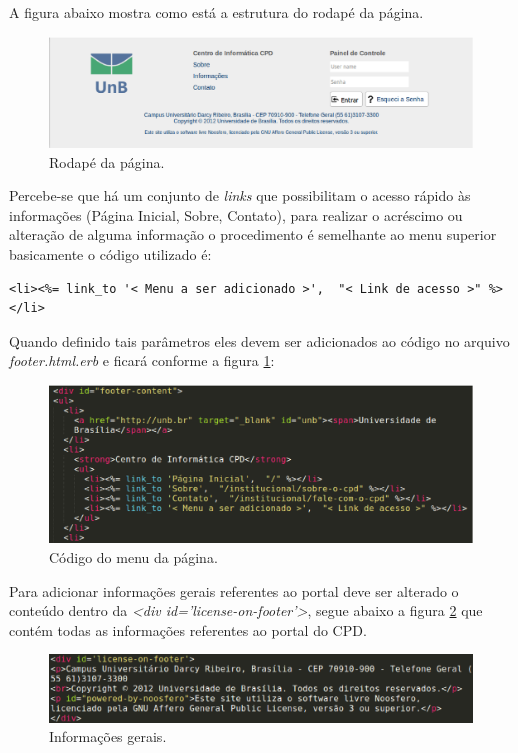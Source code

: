 A figura abaixo mostra como está a estrutura do rodapé da página.
\begin{figure}[h]
     \centering
       \includegraphics[keepaspectratio=true,scale=0.49]{figuras/footer.eps}
     \caption{Rodapé da página.}
\end{figure}

Percebe-se que há um conjunto de \emph{links} que possibilitam o acesso rápido às informações (Página Inicial, Sobre, Contato), para realizar o acréscimo ou alteração de alguma informação o procedimento é semelhante ao menu superior basicamente o código utilizado é:

\begin{lstlisting}
<li><%= link_to '< Menu a ser adicionado >',  "< Link de acesso >" %></li>
\end{lstlisting}

Quando definido tais parâmetros eles devem ser adicionados ao código no arquivo \emph{footer.html.erb} e ficará conforme a figura \ref{fig:codMenu}:

\begin{figure}[h]
     \centering
       \includegraphics[keepaspectratio=true,scale=0.3]{figuras/footerMenu.eps}
     \caption{Código do menu da página.}
     \label{fig:codMenu}
\end{figure}

\newpage
Para adicionar informações gerais referentes ao portal deve ser alterado o conteúdo dentro da \emph{<div id='license-on-footer'>}, segue abaixo a figura \ref{fig:infGeral} que contém todas as informações referentes ao portal do CPD.

\begin{figure}[h]
     \centering
       \includegraphics[keepaspectratio=true,scale=0.49]{figuras/informacoesGeraisRodape.eps}
     \caption{Informações gerais.}
     \label{fig:infGeral}
\end{figure}


